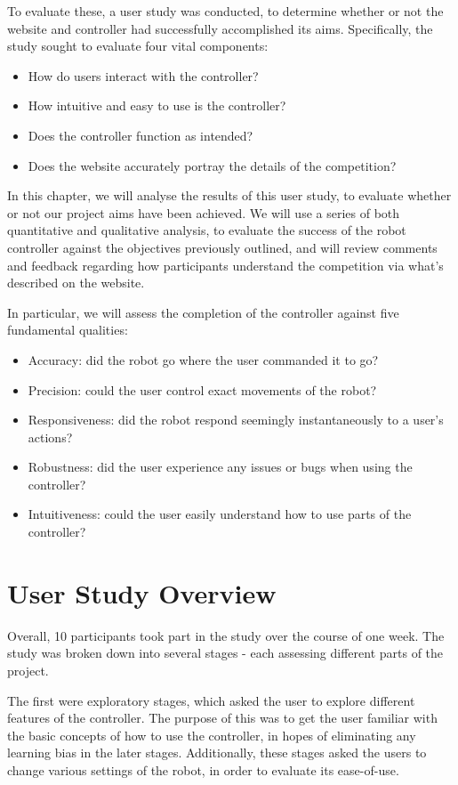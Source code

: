 \documentclass{l4proj}
\begin{document}
To evaluate these, a user study was conducted, to determine whether or not the website and controller had successfully accomplished its aims. Specifically, the study sought to evaluate four vital components:
\begin{itemize}
    \item How do users interact with the controller?
    \item How intuitive and easy to use is the controller?
    \item Does the controller function as intended?
    \item Does the website accurately portray the details of the competition?
\end{itemize}

In this chapter, we will analyse the results of this user study, to evaluate whether or not our project aims have been achieved. We will use a series of both quantitative and qualitative analysis, to evaluate the success of the robot controller against the objectives previously outlined, and will review comments and feedback regarding how participants understand the competition via what’s described on the website.

In particular, we will assess the completion of the controller against five fundamental qualities:
\begin{itemize}
    \item Accuracy: did the robot go where the user commanded it to go?
    \item Precision: could the user control exact movements of the robot?
    \item Responsiveness: did the robot respond seemingly instantaneously to a user's actions?
    \item Robustness: did the user experience any issues or bugs when using the controller?
    \item Intuitiveness: could the user easily understand how to use parts of the controller?
\end{itemize}


\section{User Study Overview}
Overall, 10 participants took part in the study over the course of one week. The study was broken down into several stages - each assessing different parts of the project. 

The first were exploratory stages, which asked the user to explore different features of the controller. The purpose of this was to get the user familiar with the basic concepts of how to use the controller, in hopes of eliminating any learning bias in the later stages. Additionally, these stages asked the users to change various settings of the robot, in order to evaluate its ease-of-use.
\end{document}
